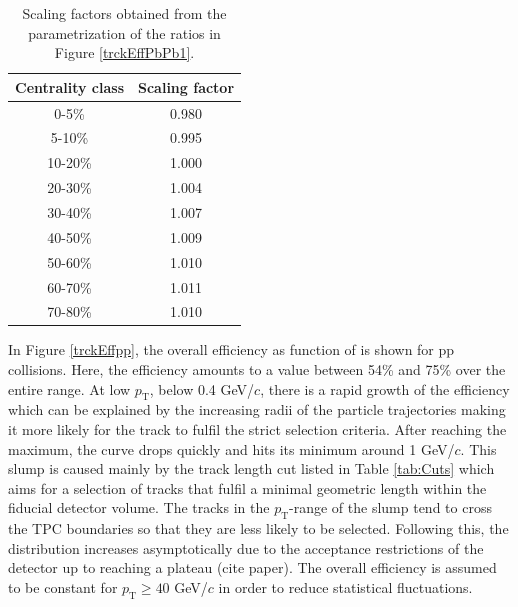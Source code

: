 \documentclass[12pt,a4paper]{report}
\begin{document}
\begin{table}[tb!]
\centering
\renewcommand{\arraystretch}{1.5}
\begin{tabular}{|c|c|}
\toprule
\rowcolor{headerBlue} \textbf{Centrality class} &  \textbf{Scaling factor}\\
\midrule
0-5\%	&	0.980	 \\
5-10\%	&	0.995	 \\
10-20\%	&	1.000	 \\
20-30\%	&	1.004	 \\
30-40\%	&	1.007	 \\
40-50\%	&	1.009	 \\
50-60\%	&	1.010	 \\
60-70\%	&	1.011	 \\
70-80\%	&	1.010	 \\
\bottomrule
\end{tabular}
\caption{Scaling factors obtained from the parametrization of the ratios in Figure \ref{trckEffPbPb1}.}
\label{tab:ScalingFactors}
\end{table} 
\hspace{-0.3cm} In Figure \ref{trckEffpp}, the overall efficiency as function of \pt is shown for pp collisions. Here, the efficiency amounts to a value between 54\% and 75\% over the entire \pt range. At low $p_\text{T}$, below 0.4 GeV/$c$, there is a rapid growth of the efficiency which can be explained by the increasing radii of the particle trajectories making it more likely for the track to fulfil the strict selection criteria. After reaching the maximum, the curve drops quickly and hits its minimum around 1 GeV/$c$. This slump is caused mainly by the track length cut listed in Table \ref{tab:Cuts} which aims for a selection of tracks that fulfil a minimal geometric length within the fiducial detector volume. The tracks in the $p_\text{T}$-range of the slump tend to cross the TPC boundaries so that they are less likely to be selected. Following this, the distribution increases asymptotically due to the acceptance restrictions of the detector up to reaching a plateau (cite paper). The overall efficiency is assumed to be constant for $p_\text{T} \geq 40$ GeV/$c$ in order to reduce statistical fluctuations. \\
\end{document}
